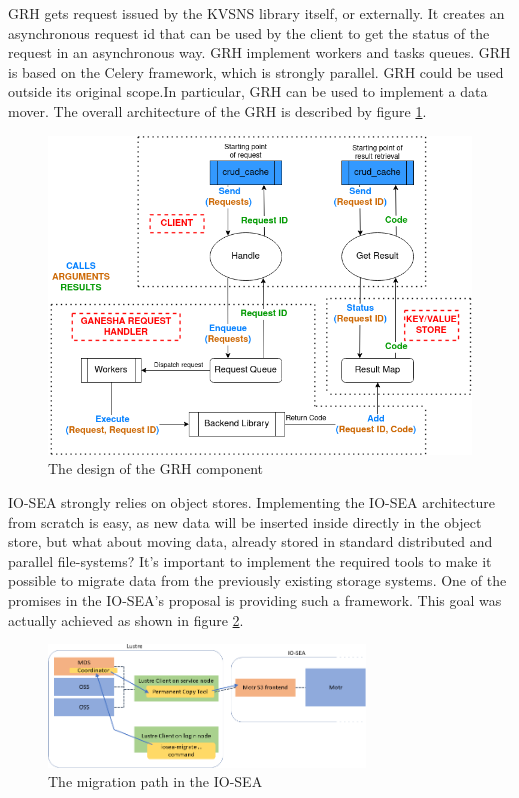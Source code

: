 GRH gets request issued by the KVSNS library itself, or externally. It creates an asynchronous request id that
can be used by the client to get the status of the request in an asynchronous way. GRH implement workers and 
tasks queues. GRH is based on the Celery framework, which is strongly parallel. GRH could be used outside its
original scope.In particular, GRH can be used to implement a data mover. The overall architecture of the GRH is
described by figure \ref{fig:grh}. 

\begin{figure}[H]
    \centering
    \includegraphics[width=\textwidth]{FIGS/GRH.png}
    \caption[GRH architecture]{ The design of the GRH component}
    \label{fig:grh}
\end{figure}

IO-SEA strongly relies on object stores. Implementing the IO-SEA architecture from scratch is easy, as new
data will be inserted inside directly in the object store, but what about moving data, already stored in standard
distributed and parallel file-systems? It's important to implement the required tools to make it possible to 
migrate data from the previously existing storage systems. One of the promises in the IO-SEA's proposal is 
providing such a framework. This goal was actually achieved as shown in figure \ref{fig:migration-path}. 

\begin{figure}[H]
    \centering
    \includegraphics[width=0.75\textwidth]{FIGS/migration-path.png}
    \caption[Migration Path]{ The migration path in the IO-SEA}
    \label{fig:migration-path}
\end{figure}

